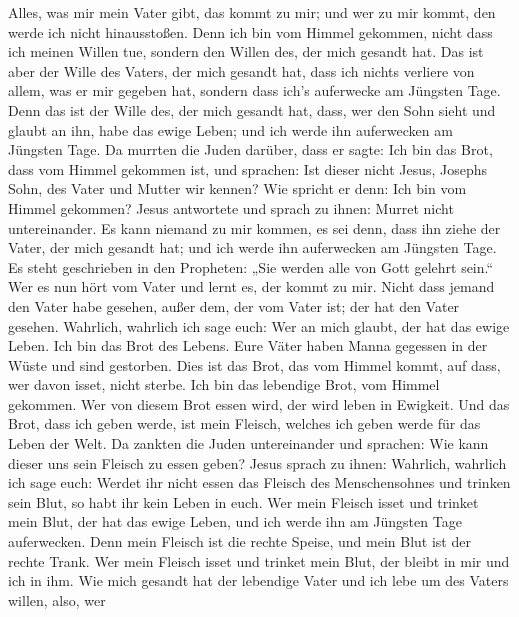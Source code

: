  Alles, was mir mein Vater gibt, das kommt zu mir; und wer
zu mir kommt, den werde ich nicht hinausstoßen.  Denn ich
bin vom Himmel gekommen, nicht dass ich meinen Willen tue, sondern den
Willen des, der mich gesandt hat.  Das ist aber der Wille
des Vaters, der mich gesandt hat, dass ich nichts verliere von allem,
was er mir gegeben hat, sondern dass ich's auferwecke am Jüngsten Tage.
 Denn das ist der Wille des, der mich gesandt hat, dass,
wer den Sohn sieht und glaubt an ihn, habe das ewige Leben; und ich
werde ihn auferwecken am Jüngsten Tage.  Da murrten die
Juden darüber, dass er sagte: Ich bin das Brot, dass vom Himmel gekommen
ist,  und sprachen: Ist dieser nicht Jesus, Josephs Sohn,
des Vater und Mutter wir kennen? Wie spricht er denn: Ich bin vom Himmel
gekommen?  Jesus antwortete und sprach zu ihnen: Murret
nicht untereinander.  Es kann niemand zu mir kommen, es sei
denn, dass ihn ziehe der Vater, der mich gesandt hat; und ich werde ihn
auferwecken am Jüngsten Tage.  Es steht geschrieben in den
Propheten: „Sie werden alle von Gott gelehrt sein.`` Wer es nun hört vom
Vater und lernt es, der kommt zu mir.  Nicht dass jemand
den Vater habe gesehen, außer dem, der vom Vater ist; der hat den Vater
gesehen.  Wahrlich, wahrlich ich sage euch: Wer an mich
glaubt, der hat das ewige Leben.  Ich bin das Brot des
Lebens.  Eure Väter haben Manna gegessen in der Wüste und
sind gestorben.  Dies ist das Brot, das vom Himmel kommt,
auf dass, wer davon isset, nicht sterbe.  Ich bin das
lebendige Brot, vom Himmel gekommen. Wer von diesem Brot essen wird, der
wird leben in Ewigkeit. Und das Brot, dass ich geben werde, ist mein
Fleisch, welches ich geben werde für das Leben der Welt. 
Da zankten die Juden untereinander und sprachen: Wie kann dieser uns
sein Fleisch zu essen geben?  Jesus sprach zu ihnen:
Wahrlich, wahrlich ich sage euch: Werdet ihr nicht essen das Fleisch des
Menschensohnes und trinken sein Blut, so habt ihr kein Leben in euch.
 Wer mein Fleisch isset und trinket mein Blut, der hat das
ewige Leben, und ich werde ihn am Jüngsten Tage auferwecken.
 Denn mein Fleisch ist die rechte Speise, und mein Blut ist
der rechte Trank.  Wer mein Fleisch isset und trinket mein
Blut, der bleibt in mir und ich in ihm.  Wie mich gesandt
hat der lebendige Vater und ich lebe um des Vaters willen, also, wer
